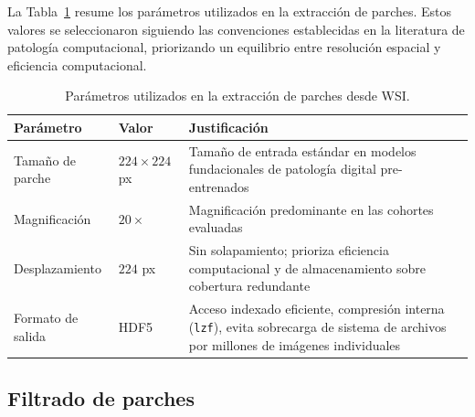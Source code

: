 La Tabla~\ref{tab:parametros_tiling} resume los parámetros utilizados en la extracción de parches. Estos valores se seleccionaron siguiendo las convenciones establecidas en la literatura de patología computacional, priorizando un equilibrio entre resolución espacial y eficiencia computacional.

\begin{table}[htbp]
    \centering
    \caption{Parámetros utilizados en la extracción de parches desde WSI.}
    \label{tab:parametros_tiling}
    \begin{tabular}{p{4cm} p{3cm} p{7cm}}
        \toprule
        \textbf{Parámetro} & \textbf{Valor} & \textbf{Justificación} \\
        \midrule
        Tamaño de parche & $224 \times 224$ px & Tamaño de entrada estándar en modelos fundacionales de patología digital pre-entrenados  \\
        Magnificación & $20\times$ & Magnificación predominante en las cohortes evaluadas \\
        Desplazamiento & $224$ px & Sin solapamiento; prioriza eficiencia computacional y de almacenamiento sobre cobertura redundante \\
        Formato de salida & HDF5 & Acceso indexado eficiente, compresión interna (\texttt{lzf}), evita sobrecarga de sistema de archivos por millones de imágenes individuales \\
        \bottomrule
    \end{tabular}
\end{table}



\subsection{Filtrado de parches}
\label{sec:filtrado_parches}

